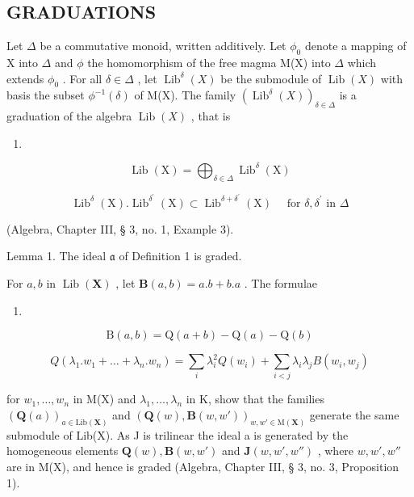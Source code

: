 \subsection{GRADUATIONS}

Let \(\Delta\) be a commutative monoid, written additively. Let \(\phi_0\) denote a mapping of X into \(\Delta\) and \(\phi\) the homomorphism of the free magma M(X) into \(\Delta\) which extends \(\phi_0\) . For all \(\delta \in \Delta\) , let \(\operatorname{Lib}^{\delta}(X)\) be the submodule of \(\operatorname{Lib}(X)\) with basis the subset \(\phi^{-1}(\delta)\) of M(X). The family \((\operatorname{Lib}^{\delta}(X))_{\delta \in \Delta}\) is a graduation of the algebra \(\operatorname{Lib}(X)\) , that is

\begin{enumerate}
\def\labelenumi{(\arabic{enumi})}
\setcounter{enumi}{7}
\tightlist
\item
\end{enumerate}

\[
\operatorname{Lib} (\mathrm{X}) = \bigoplus_ {\delta \in \Delta} \operatorname{Lib} ^ {\delta} (\mathrm{X})\tag{8}
\]

\[
\operatorname{Lib} ^ {\delta} (\mathrm{X}). \operatorname{Lib} ^ {\delta^ {\prime}} (\mathrm{X}) \subset \operatorname{Lib} ^ {\delta + \delta^ {\prime}} (\mathrm{X}) \quad \text { for } \delta , \delta^ {\prime} \text { in } \Delta\tag{9}
\]

(Algebra, Chapter III, § 3, no. 1, Example 3).

Lemma 1. The ideal \(\mathfrak{a}\) of Definition 1 is graded.

For \(a, b\) in \(\operatorname{Lib}(\mathbf{X})\) , let \(\mathbf{B}(a, b) = a.b + b.a\) . The formulae

\begin{enumerate}
\def\labelenumi{(\arabic{enumi})}
\setcounter{enumi}{9}
\tightlist
\item
\end{enumerate}

\[
\mathrm{B} (a, b) = \mathrm{Q} (a + b) - \mathrm{Q} (a) - \mathrm{Q} (b)\tag{10}
\]

\[
Q \left(\lambda_ {1}. w _ {1} + \dots + \lambda_ {n}. w _ {n}\right) = \sum_ {i} \lambda_ {i} ^ {2} Q \left(w _ {i}\right) + \sum_ {i <   j} \lambda_ {i} \lambda_ {j} B \left(w _ {i}, w _ {j}\right)\tag{11}
\]

for \(w_1, \ldots, w_n\) in M(X) and \(\lambda_1, \ldots, \lambda_n\) in K, show that the families \((\mathbf{Q}(a))_{a \in \mathrm{Lib}(\mathbf{X})}\) and \((\mathbf{Q}(w), \mathbf{B}(w, w'))_{w, w' \in \mathrm{M}(\mathbf{X})}\) generate the same submodule of Lib(X). As J is trilinear the ideal a is generated by the homogeneous elements \(\mathbf{Q}(w), \mathbf{B}(w, w')\) and \(\mathbf{J}(w, w', w'')\) , where \(w, w', w''\) are in M(X), and hence is graded (Algebra, Chapter III, § 3, no. 3, Proposition 1).

